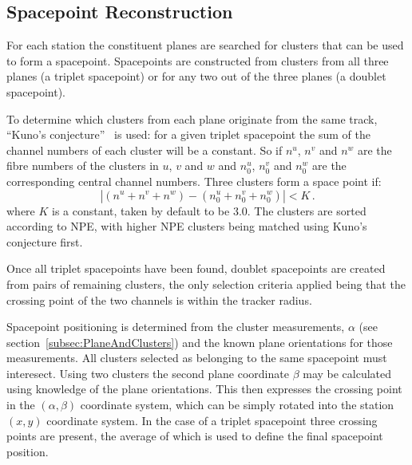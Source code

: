   \subsection{Spacepoint Reconstruction}
  \label{subsec:SpacepointReconstruction}
  For each station the constituent planes are searched for clusters that can be used to form a spacepoint. Spacepoints are constructed from clusters from all three planes (a triplet spacepoint) or for any two out of the three planes (a doublet spacepoint). 

  To determine which clusters from each plane originate from the same track, ``Kuno's conjecture''~\cite{MiceTrackers} is used: for a given triplet spacepoint the sum of the channel numbers of each cluster will be a constant.  So if $n^u$, $n^v$ and $n^w$ are the fibre numbers of the clusters in $u$, $v$ and $w$ and $n^u_0$, $n^v_0$ and $n^w_0$ are the corresponding central channel numbers. Three clusters form a space point if:
  \begin{equation}
    | (n^u + n^v + n^w) - (n^u_0 + n^v_0 + n^w_0) | < K \, .
  \end{equation}
  where $K$ is a constant, taken by default to be 3.0. The clusters are sorted according to NPE, with higher NPE clusters being matched using Kuno's conjecture first. 
  
  Once all triplet spacepoints have been found, doublet spacepoints are created from pairs of remaining clusters, the only selection criteria applied being that the crossing point of the two channels is within the tracker radius. 
  
  Spacepoint positioning is determined from the cluster measurements, $\alpha$ (see section~\ref{subsec:PlaneAndClusters}) and the known plane orientations for those measurements. All clusters selected as belonging to the same spacepoint must interesect. Using two clusters the second plane coordinate $\beta$ may be calculated using knowledge of the plane orientations. This then expresses the crossing point in the $(\alpha, \beta)$ coordinate system, which can be simply rotated into the station $(x, y)$ coordinate system. In the case of a triplet spacepoint three crossing points are present, the average of which is used to define the final spacepoint position.

%   

